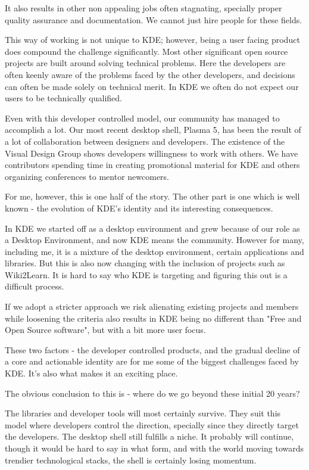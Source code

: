 It also results in other non appealing jobs often stagnating, specially proper quality assurance and documentation. We cannot just hire people for these fields.

This way of working is not unique to KDE; however, being a user facing product does compound the challenge significantly. Most other significant open source projects are built around solving technical problems. Here the developers are often keenly aware of the problems faced by the other developers, and decisions can often be made solely on technical merit. In KDE we often do not expect our users to be technically qualified.

Even with this developer controlled model, our community has managed to accomplish a lot. Our most recent desktop shell, Plasma 5, has been the result of a lot of collaboration between designers and developers. The existence of the Visual Design Group shows developers willingness to work with others. We have contributors spending time in creating promotional material for KDE and others organizing conferences to mentor newcomers.

For me, however, this is one half of the story. The other part is one which is well known - the evolution of KDE’s identity and its interesting consequences.

In KDE we started off as a desktop environment and grew because of our role as a Desktop Environment, and now KDE means the community. However for many, including me, it is a mixture of the desktop environment, certain applications and libraries. But this is also now changing with the inclusion of projects such as Wiki2Learn. It is hard to say who KDE is targeting and figuring this out is a difficult process.

If we adopt a stricter approach we risk alienating existing projects and members while loosening the criteria also results in KDE being no different than "Free and Open Source software", but with a bit more user focus. 

These two factors - the developer controlled products, and the gradual decline of a core and actionable identity are for me some of the biggest challenges faced by KDE. It’s also what makes it an exciting place.

The obvious conclusion to this is - where do we go beyond these initial 20 years?

The libraries and developer tools will most certainly survive. They suit this model where developers control the direction, specially since they directly target the developers. The desktop shell still fulfills a niche. It probably will continue, though it would be hard to say in what form, and with the world moving towards trendier technological stacks, the shell is certainly losing momentum.

